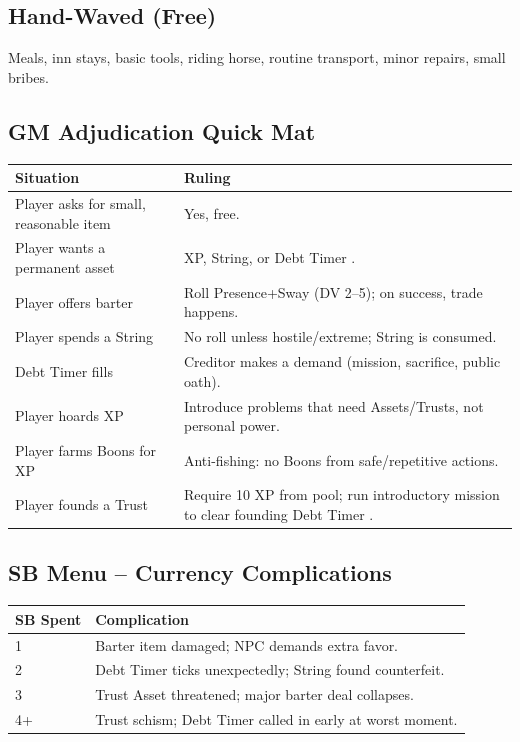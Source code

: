 \subsection{Hand-Waved (Free)}
\label{ref:free}

Meals, inn stays, basic tools, riding horse, routine transport, minor repairs, small bribes.

\subsection{GM Adjudication Quick Mat}
\label{ref:gm-mat}

\begin{center}
\small
\begin{tabular}{p{3cm}p{10cm}}
\toprule
\textbf{Situation} & \textbf{Ruling} \\
\midrule
Player asks for small, reasonable item & Yes, free. \\
Player wants a permanent asset & XP, String, or Debt Timer . \\
Player offers barter & Roll Presence+Sway (DV 2--5); on success, trade happens. \\
Player spends a String & No roll unless hostile/extreme; String is consumed. \\
Debt Timer fills & Creditor makes a demand (mission, sacrifice, public oath). \\
Player hoards XP & Introduce problems that need Assets/Trusts, not personal power. \\
Player farms Boons for XP & Anti-fishing: no Boons from safe/repetitive actions. \\
Player founds a Trust & Require 10 XP from pool; run introductory mission to clear founding Debt Timer . \\
\bottomrule
\end{tabular}
\end{center}

\subsection{SB Menu -- Currency Complications}
\label{ref:sb-currency}

\begin{center}
\small
\begin{tabular}{ll}
\toprule
\textbf{SB Spent} & \textbf{Complication} \\
\midrule
1 & Barter item damaged; NPC demands extra favor. \\
2 & Debt Timer ticks unexpectedly; String found counterfeit. \\
3 & Trust Asset threatened; major barter deal collapses. \\
4+ & Trust schism; Debt Timer called in early at worst moment. \\
\bottomrule
\end{tabular}
\end{center}

